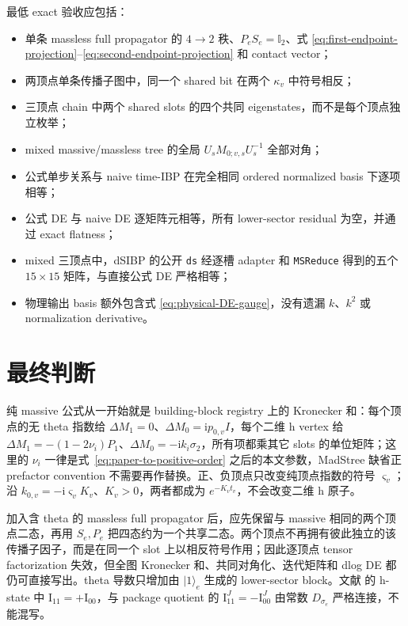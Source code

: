 \documentclass[11pt,a4paper]{ctexart}
\newcommand{\ii}{\mathrm i}
\newcommand{\Id}{\mathbb I}
\begin{document}
最低 exact 验收应包括：
\begin{itemize}
  \item 单条 massless full propagator 的 $4\to2$ 秩、$P_eS_e=\Id_2$、式 \eqref{eq:first-endpoint-projection}--\eqref{eq:second-endpoint-projection} 和 contact vector；
  \item 两顶点单条传播子图中，同一个 shared bit 在两个 $\kappa_v$ 中符号相反；
  \item 三顶点 chain 中两个 shared slots 的四个共同 eigenstates，而不是每个顶点独立枚举；
  \item mixed massive/massless tree 的全局 $U_sM_{0;v,s}U_s^{-1}$ 全部对角；
  \item 公式单步关系与 naive time-IBP 在完全相同 ordered normalized basis 下逐项相等；
  \item 公式 DE 与 naive DE 逐矩阵元相等，所有 lower-sector residual 为空，并通过 exact flatness；
  \item mixed 三顶点中，dSIBP 的公开 \texttt{ds} 经逐槽 adapter 和 \texttt{MSReduce} 得到的五个 $15\times15$ 矩阵，与直接公式 DE 严格相等；
  \item 物理输出 basis 额外包含式 \eqref{eq:physical-DE-gauge}，没有遗漏 $k$、$k^2$ 或 normalization derivative。
\end{itemize}

\section{最终判断}

纯 massive 公式从一开始就是 building-block registry 上的 Kronecker 和：每个顶点的无 theta 指数给 $\Delta M_1=0$、$\Delta M_0=\ii p_{0,v}I$，每个二维 h vertex 给 $\Delta M_1=-(1-2\nu_i)P_1$、$\Delta M_0=-\ii k_i\sigma_2$，所有项都乘其它 slots 的单位矩阵；这里的 $\nu_i$ 一律是式~\eqref{eq:paper-to-positive-order} 之后的本文参数，MadStree 缺省正 prefactor convention 不需要再作替换。正、负顶点只改变纯顶点指数的符号 $\varsigma_v$；沿 $k_{0,v}=-\ii\varsigma_vK_v$、$K_v>0$，两者都成为 $e^{-K_vt_v}$，不会改变二维 h 原子。

加入含 theta 的 massless full propagator 后，应先保留与 massive 相同的两个顶点二态，再用 $S_e,P_e$ 把四态约为一个共享二态。两个顶点不再拥有彼此独立的该传播子因子，而是在同一个 slot 上以相反符号作用；因此逐顶点 tensor factorization 失效，但全图 Kronecker 和、共同对角化、迭代矩阵和 dlog DE 都仍可直接写出。theta 导数只增加由 $|1\rangle_e$ 生成的 lower-sector block。文献 \cite{Chen:2023eic} 的 h-state 中 $\text{I}_{11}=+\text{I}_{00}$，与 package quotient 的 $\text{I}_{11}^J=-\text{I}_{00}^J$ 由常数 $D_{\sigma_e}$ 严格连接，不能混写。
\end{document}
